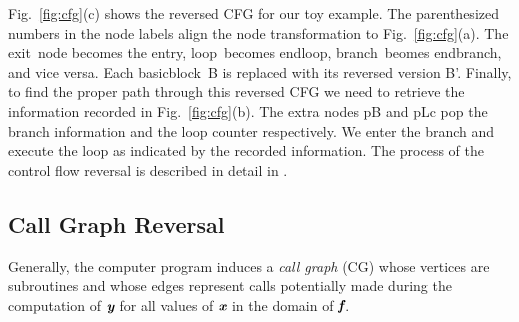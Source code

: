 \documentclass[11pt]{article}
\newcommand{\entry}{entry}
\newcommand{\exit}{exit}
\newcommand{\Loop}{loop}
\newcommand{\EndLoop}{endloop}
\newcommand{\branch}{branch}
\newcommand{\EndBranch}{endbranch}
\newcommand{\basicblock}{basicblock}
\newcommand{\bmf}{\mbox{\bf\em f}}
\newcommand{\bmx}{\mbox{\bf\em x}}
\newcommand{\bmy}{\mbox{\bf\em y}}
\newcommand{\reffig}[1]{{Fig.~\ref{#1}}}
\begin{document}
\reffig{fig:cfg}(c) shows the reversed CFG for our toy example. 
The parenthesized numbers in the node labels align the 
node transformation to \reffig{fig:cfg}(a). 
The \exit\ node becomes 
the \entry, \Loop\ becomes \EndLoop, \branch\ beomes \EndBranch, and vice versa. 
Each \basicblock\  B is replaced with its reversed version B'.  
Finally, to find the proper path through this reversed CFG we need to retrieve 
the information recorded in  \reffig{fig:cfg}(b). The extra nodes pB and pLc 
pop the branch information and the loop counter respectively.  
We enter the branch and execute the loop as indicated by the recorded information. 
The process of the control flow reversal is described in detail in 
\cite{NULF04CFR}. 

\subsection{Call Graph Reversal} \label{ssec:cgReversal}

Generally, the computer program 
induces a {\em call graph} (CG) \cite{ASU86}
whose vertices are subroutines and whose edges 
represent calls potentially made during the computation of $\bmy$ for all 
values of $\bmx$ in the domain of $\bmf$.
\end{document}
